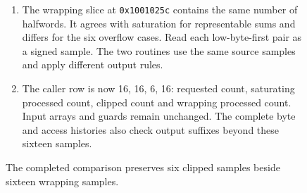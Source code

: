 \begin{figure}[htbp]
\begin{minipage}{\linewidth}
\begin{enumerate}
      \item The wrapping slice at \texttt{0x1001025c} contains the same number of halfwords. It agrees with saturation for representable sums and differs for the six overflow cases. Read each low-byte-first pair as a signed sample. The two routines use the same source samples and apply different output rules.
      \item The caller row is now 16, 16, 6, 16: requested count, saturating processed count, clipped count and wrapping processed count. Input arrays and guards remain unchanged. The complete byte and access histories also check output suffixes beyond these sixteen samples.
    \end{enumerate}
  \end{minipage}
  \caption{The completed comparison preserves six clipped samples beside sixteen wrapping samples.}
  \label{capture:020-pcm-mixing-f03}
  \label{pcm-f03}
\end{figure}
\par
